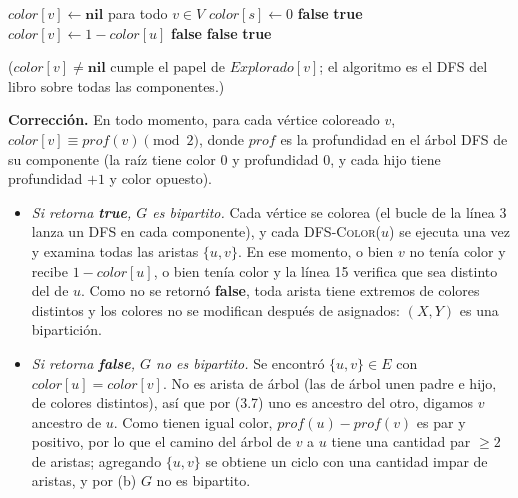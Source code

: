 \begin{algorithm}[H]
\caption{Test de bipartición con DFS}
\begin{algorithmic}[1]
  \State $color[v]\gets\textbf{nil}$ para todo $v\in V$
      \State $color[s]\gets0$
       \State \Return \textbf{false} \EndIf
    \EndIf
  \EndFor
  \State \Return \textbf{true} 
\EndFunction
\Statex
{}
      \State $color[v]\gets1-color[u]$
       \State \Return \textbf{false} \EndIf
      \State \Return \textbf{false} 
    \EndIf
  \EndFor
  \State \Return \textbf{true}
\EndFunction
\end{algorithmic}
\end{algorithm}
($color[v]\neq\textbf{nil}$ cumple el papel de $Explorado[v]$; el algoritmo es el DFS del libro sobre
todas las componentes.)

\textbf{Corrección.} En todo momento, para cada vértice coloreado $v$, $color[v]\equiv prof(v)\pmod 2$,
donde $prof$ es la profundidad en el árbol DFS de su componente (la raíz tiene color 0 y profundidad 0,
y cada hijo tiene profundidad $+1$ y color opuesto).
\begin{itemize}
\item \emph{Si retorna \textbf{true}, $G$ es bipartito.} Cada vértice se colorea (el bucle de la línea
3 lanza un DFS en cada componente), y cada \textsc{DFS-Color}($u$) se ejecuta una vez y examina todas
las aristas $\{u,v\}$. En ese momento, o bien $v$ no tenía color y recibe $1-color[u]$, o bien tenía
color y la línea 15 verifica que sea distinto del de $u$. Como no se retornó \textbf{false}, toda arista
tiene extremos de colores distintos y los colores no se modifican después de asignados: $(X,Y)$ es una
bipartición.
\item \emph{Si retorna \textbf{false}, $G$ no es bipartito.} Se encontró $\{u,v\}\in E$ con
$color[u]=color[v]$. No es arista de árbol (las de árbol unen padre e hijo, de colores distintos), así
que por (3.7) uno es ancestro del otro, digamos $v$ ancestro de $u$. Como tienen igual color,
$prof(u)-prof(v)$ es par y positivo, por lo que el camino del árbol de $v$ a $u$ tiene una cantidad par
$\ge2$ de aristas; agregando $\{u,v\}$ se obtiene un ciclo con una cantidad impar de aristas, y por (b)
$G$ no es bipartito.
\end{itemize}

